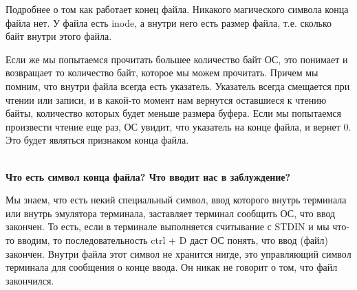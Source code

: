 Подробнее о том как работает конец файла. Никакого магического символа конца файла нет. У файла есть inode, а внутри него есть размер файла, т.е. сколько байт внутри этого файла.

Если же мы попытаемся прочитать большее количество байт ОС, это понимает и возвращает то количество байт, которое мы можем прочитать. Причем мы помним, что внутри файла всегда есть указатель. Указатель всегда смещается при чтении или записи, и в какой-то момент нам вернутся оставшиеся к чтению байты, количество которых будет меньше размера буфера. Если мы попытаемся произвести чтение еще раз, ОС увидит, что указатель на конце файла, и вернет 0. Это будет являться признаком конца файла. 

~\\
\textbf{Что есть символ конца файла? Что вводит нас в заблуждение?}

Мы знаем, что есть некий специальный символ, ввод которого внутрь терминала или внутрь эмулятора терминала, заставляет терминал сообщить ОС, что ввод закончен. То есть, если в терминале выполняется считывание с STDIN и мы что-то вводим, то последовательность ctrl + D даст ОС понять, что ввод (файл) закончен. Внутри файла этот символ не хранится нигде, это управляющий символ терминала для сообщения о конце ввода. Он никак не говорит о том, что файл закончился.
